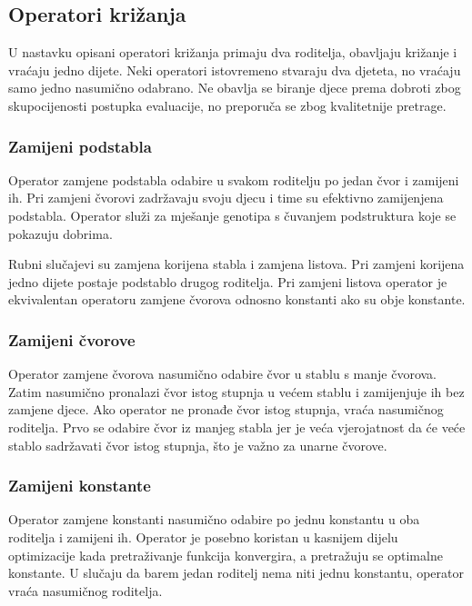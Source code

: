 \documentclass[times, utf8, numeric, diplomski]{fer}
\begin{document}
\subsection{Operatori križanja}
U nastavku opisani operatori križanja primaju dva roditelja, obavljaju križanje i vraćaju jedno dijete. Neki operatori istovremeno stvaraju dva djeteta, no vraćaju samo jedno nasumično odabrano. Ne obavlja se biranje djece prema dobroti zbog skupocijenosti postupka evaluacije, no preporuča se zbog kvalitetnije pretrage.

\subsubsection{Zamijeni podstabla}
Operator zamjene podstabla odabire u svakom roditelju po jedan čvor i zamijeni ih. Pri zamjeni čvorovi zadržavaju svoju djecu i time su efektivno zamijenjena podstabla. Operator služi za mješanje genotipa s čuvanjem podstruktura koje se pokazuju dobrima. %

Rubni slučajevi su zamjena korijena stabla i zamjena listova. Pri zamjeni korijena jedno dijete postaje podstablo drugog roditelja. Pri zamjeni listova operator je ekvivalentan operatoru zamjene čvorova odnosno konstanti ako su obje konstante.


\subsubsection{Zamijeni čvorove}
Operator zamjene čvorova nasumično odabire čvor u stablu s manje čvorova. Zatim nasumično pronalazi čvor istog stupnja u većem stablu i zamijenjuje ih bez zamjene djece. Ako operator ne pronađe čvor istog stupnja, vraća nasumičnog roditelja. Prvo se odabire čvor iz manjeg stabla jer je veća vjerojatnost da će veće stablo sadržavati čvor istog stupnja, što je važno za unarne čvorove.

\subsubsection{Zamijeni konstante}
Operator zamjene konstanti nasumično odabire po jednu konstantu u oba roditelja i zamijeni ih. Operator je posebno koristan u kasnijem dijelu optimizacije kada pretraživanje funkcija konvergira, a pretražuju se optimalne konstante. U slučaju da barem jedan roditelj nema niti jednu konstantu, operator vraća nasumičnog roditelja.
\end{document}
